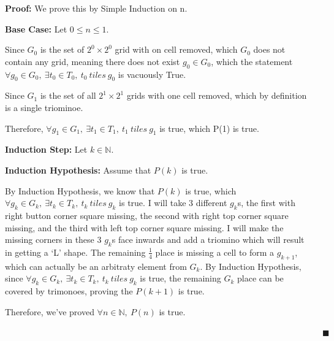 \documentclass[12pt]{article}
\begin{document}
\begin{enumerate}[label=(\alph*)]
    \textbf{Proof:} We prove this by Simple Induction on n.


    \textbf{Base Case:} Let $0 \leq n \leq 1$.

    Since $G_0$ is the set of $2^0 \times 2^0$ grid with on cell removed, which $G_0$ does not contain any grid, meaning there does not exist $g_0 \in G_0$, which the statement $\forall g_0 \in G_0,\ \exists t_0 \in T_0,\ t_0\ tiles\ g_0$ is vacuously True.

    Since $G_1$ is the set of all $2^1 \times 2^1$ grids with one cell removed, which by definition is a single triominoe.
    
    Therefore, $\forall g_1 \in G_1,\ \exists t_1 \in T_1,\ t_1\ tiles\ g_1$ is true, which P(1) is true.

    \textbf{Induction Step:} Let $k \in \mathbb{N}$.
    
    \textbf{Induction Hypothesis:} Assume that $P(k)$ is true.

    By Induction Hypothesis, we know that $P(k)$ is true, which $\forall g_k \in G_k,\ \exists t_k \in T_k,\ t_k\ tiles\ g_k $ is true.
    I will take 3 different $g_k$s, the first with right button corner square missing, the second with right top corner square missing, and the third with left top corner square missing.
    I will make the missing corners in these 3 $g_k$s face inwards and add a triomino which will result in getting a `L' shape.
    The remaining $\frac{1}{4}$ place is missing a cell to form a $g_{k+1}$, which can actually be an arbitraty element from $G_k$.
    By Induction Hypothesis, since $\forall g_k \in G_k,\ \exists t_k \in T_k,\ t_k\ tiles\ g_k $ is true, the remaining $G_k$ place can be covered by trimonoes, proving the $P(k+1)$ is true.

    Therefore, we've proved $\forall n \in \mathbb{N},\ P(n)$ is true. 

    $\quad \quad \quad \quad \quad \quad \quad \quad \quad \quad \quad \quad \quad \quad \quad \quad \quad \quad \quad \quad \quad \quad \quad \quad \quad \quad \quad \quad \quad \quad \quad \quad \quad \quad \quad \quad \quad \blacksquare $
\end{enumerate}

\newpage
\end{document}
